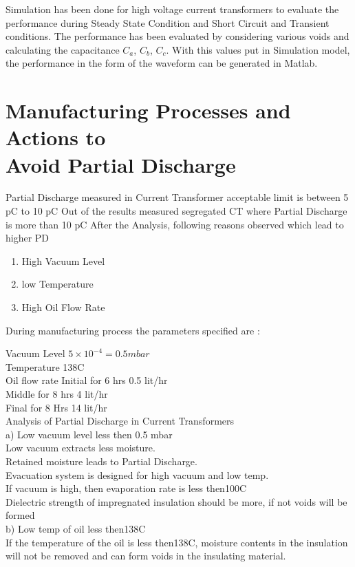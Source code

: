 Simulation has been done for high voltage current transformers to evaluate the performance during Steady State Condition and Short Circuit and Transient conditions. The performance has been evaluated by considering various voids and calculating the capacitance $C_a$, $C_b$, $C_c$. With this values put in Simulation model, the performance in the form of the waveform can be generated in Matlab\setlength{\parskip}{0em}.

\section[Manufacturing Processes and Actions to Avoid Partial Discharge]{Manufacturing Processes and Actions to\\Avoid Partial Discharge}
Partial Discharge measured in Current Transformer acceptable limit is between 5 pC to 10 pC Out of the results measured segregated CT where Partial Discharge is more than 10 pC After the Analysis, following reasons observed which lead to higher PD

\begin{enumerate}
\item High Vacuum Level
\item low Temperature
\item High Oil Flow Rate
\end{enumerate}

During manufacturing process the parameters specified are :

Vacuum Level $5 \times 10^{-4} = 0.5 mbar$\\
Temperature 138\textdegree C \\

Oil flow rate Initial for 6 hrs 0.5 lit/hr\\
Middle for 8 hrs 4 lit/hr\\
Final for 8 Hrs 14 lit/hr\\
Analysis of Partial Discharge in Current Transformers\\
a) Low vacuum level less then 0.5 mbar\\
Low vacuum extracts less moisture.\\
Retained moisture leads to Partial Discharge.\\
Evacuation system is designed for high vacuum and low temp.\\
If vacuum is high, then evaporation rate is less then100\textdegree C\\
Dielectric strength of impregnated insulation should be more, if not voids will be formed \\
b) Low temp of oil less then138\textdegree C\\
If the temperature of the oil is less then138\textdegree C, moisture contents in the insulation will not be removed and can form voids in the insulating material.

